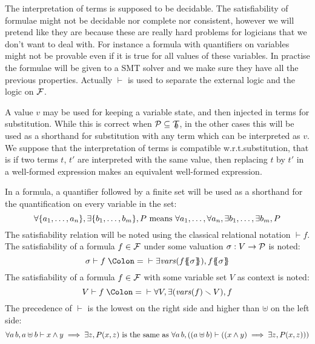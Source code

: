 \documentclass{article}
\begin{document}
The interpretation of terms is supposed to be decidable.
The satisfiability of formulae might not be decidable nor complete nor consistent, however we will pretend like they are because these are really hard problems for logicians that we don't want to deal with.
For instance a formula with quantifiers on variables might not be provable even if it is true for all values of these variables.
In practise the formulae will be given to a SMT solver and we make sure they have all the previous properties.
Actually \(\vdash\) is used to separate the external logic and the logic on \({\mathcal{F}}\).

A value \(v\) may be used for keeping a variable state, and then injected in terms for substitution.
While this is correct when \(\mathcal{P} \subseteq {\mathcal{T}}_{\!\!\emptyset}\), in the other cases this will be used as a shorthand for substitution with any term which can be interpreted as \(v\).
We suppose that the interpretation of terms is compatible w.r.t.\@ substitution, that is if two terms \(t\), \(t'\) are interpreted with the same value, then replacing \(t\) by \(t'\) in a well-formed expression makes an equivalent well-formed expression.
\begin{noti}
 In a formula, a quantifier followed by a finite set will be used as a shorthand for the quantification on every variable in the set:
\[ \forall {\left\{a_1, \dots, a_n\right\}}, \exists {\left\{b_1, \dots, b_m\right\}}, P \text{ means } \forall a_1, \dots, \forall a_n, \exists b_1, \dots, \exists b_m, P \]
 The satisfiability relation will be noted using the classical relational notation \(\vdash f\).
 The satisfiability of a formula \(f \in {\mathcal{F}}\) under some valuation \(\sigma: V \to \mathcal{P}\) is noted:
\[ \sigma \vdash f \defnotation \vdash \exists \fvars{f\psubst{\sigma}}, f\psubst{\sigma} \]
 The satisfiability of a formula \(f \in {\mathcal{F}}\) with some variable set \(V\) as context is noted:
\[ V \vdash f \defnotation \vdash \forall V, \exists\mpar{\fvars{f} \setminus V}, f \]
 The precedence of \(\vdash\) is the lowest on the right side and higher than \(\uplus\) on the left side:
\[ \forall a \, b, a \uplus b \vdash x \wedge y \implies \exists z, P{\left(x,z\right)} \text{ is the same as } \forall a \, b, {\left({\left(a \uplus b\right)} \vdash {\left({\left(x \wedge y\right)} \implies \exists z, P{\left(x,z\right)}\right)}\right)} \]
\end{noti}
\end{document}
